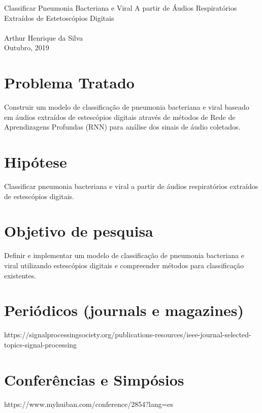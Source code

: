 \documentclass[12pt]{article}
\begin{document}
\begin{center}
{\large Classificar Pneumonia Bacteriana e Viral A partir de \'Audios Respirat\'orios Extra\'idos de Estetosc\'opios Digitais} \\  %
\ \\

Arthur Henrique da Silva \\
Outubro, 2019

\end{center}

\section{Problema Tratado}

Construir um modelo de classifica\c{c}\~ao de pneumonia bacteriana e viral baseado em \'audios extra\'idos de estesc\'opios digitais atrav\'es de m\'etodos de
Rede de Aprendizagens Profundas (RNN) para an\'alise dos sinais de \'audio coletados.

\section{Hip\'otese}
Classificar pneumonia bacteriana e viral a partir de \'audios respirat\'orios extra\'idos de estesc\'opios digitais.

\section{Objetivo de pesquisa}
Definir e implementar um modelo de classifica\c{c}\~ao de pneumonia bacteriana e viral utilizando estesc\'opios digitais e compreender m\'etodos para classifica\c{c}\~ao existentes.

\section{Peri\'odicos (journals e magazines)}
https://signalprocessingsociety.org/publications-resources/ieee-journal-selected-topics-signal-processing

\section{Confer\^encias e Simp\'osios}
https://www.myhuiban.com/conference/2854?lang=es
\end{document}
